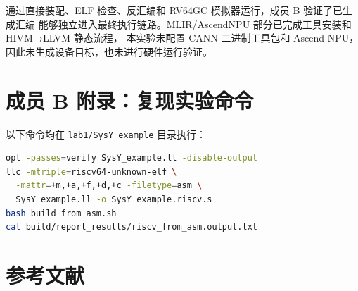 \documentclass[a4paper]{article}
\begin{document}
通过直接装配、ELF 检查、反汇编和 RV64GC 模拟器运行，成员 B 验证了已生成汇编
能够独立进入最终执行链路。MLIR/AscendNPU 部分已完成工具安装和 HIVM→LLVM 静态流程，
本实验未配置 CANN 二进制工具包和 Ascend NPU，因此未生成设备目标，也未进行硬件运行验证。

\clearpage
\section*{成员 B 附录：复现实验命令}

以下命令均在 \texttt{lab1/SysY\_example} 目录执行：

\begin{lstlisting}[language=bash,caption={RISC-V 后端实验的最小复现命令}]
opt -passes=verify SysY_example.ll -disable-output
llc -mtriple=riscv64-unknown-elf \
  -mattr=+m,+a,+f,+d,+c -filetype=asm \
  SysY_example.ll -o SysY_example.riscv.s
bash build_from_asm.sh
cat build/report_results/riscv_from_asm.output.txt
\end{lstlisting}

\clearpage
\section*{参考文献}


\end{document}

